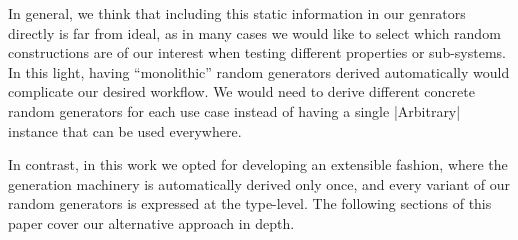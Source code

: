 %
In general, we think that including this static information in our genrators
directly is far from ideal, as in many cases we would like to select which
random constructions are of our interest when testing different properties or
sub-systems.
%
In this light, having ``monolithic'' random generators derived automatically
would complicate our desired workflow.
%
We would need to derive different concrete random generators for each use case
instead of having a single |Arbitrary| instance that can be used everywhere.


In contrast, in this work we opted for developing an extensible fashion, where
the generation machinery is automatically derived only once, and every variant
of our random generators is expressed at the type-level.
%
The following sections of this paper cover our alternative approach in depth.
